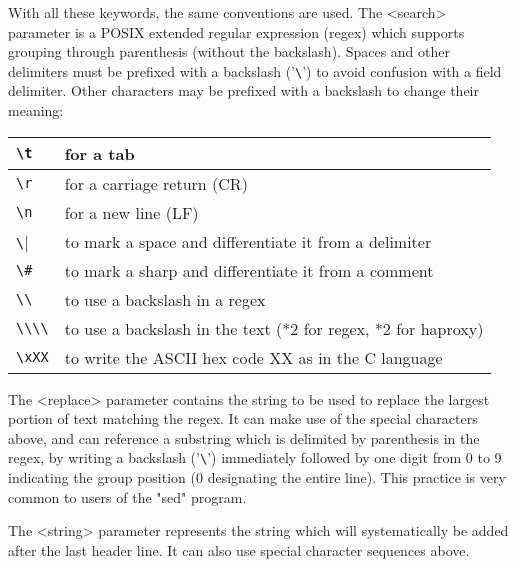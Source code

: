 With all these keywords, the same conventions are used. The <search> parameter
is a POSIX extended regular expression (regex) which supports grouping through
parenthesis (without the backslash). Spaces and other delimiters must be
prefixed with a backslash ('\verb|\|') to avoid confusion with a field delimiter.
Other characters may be prefixed with a backslash to change their meaning:

\vspace{3mm}
\begin{tabular}{|l|l|}
\hline
\verb|\t|   & for a tab \\
\hline
\verb|\r|   & for a carriage return (CR) \\
\hline
\verb|\n|   & for a new line (LF) \\
\hline
\verb|\|    & to mark a space and differentiate it from a delimiter \\
\hline
\verb|\#|   & to mark a sharp and differentiate it from a comment \\
\hline
\verb|\\|   & to use a backslash in a regex \\
\hline
\verb|\\\\| & to use a backslash in the text (*2 for regex, *2 for haproxy) \\
\hline
\verb|\xXX| & to write the ASCII hex code XX as in the C language \\
\hline
\end{tabular}
\vspace{3mm}

The <replace> parameter contains the string to be used to replace the largest
portion of text matching the regex. It can make use of the special characters
above, and can reference a substring which is delimited by parenthesis in the
regex, by writing a backslash  ('\verb|\|') immediately followed by one digit from 0 to
9 indicating the group position (0 designating the entire line). This practice
is very common to users of the "sed" program.

The <string> parameter represents the string which will systematically be added
after the last header line. It can also use special character sequences above.

